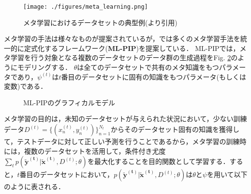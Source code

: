 \begin{figure}[tbp]
  \begin{center}
    \texttt{[image: ./figures/meta\_learning.png]}
    \caption{メタ学習におけるデータセットの典型例(\cite{Ravi2016}より引用)}
    \label{fig:ml_example}
  \end{center}
\end{figure}

メタ学習の手法は様々なものが提案されているが\cite{maml, Ravi2016}，\cite{Gordon2018}では多くのメタ学習手法を統一的に定式化するフレームワーク({\bf ML-PIP})を提案している．
ML-PIPでは，メタ学習を行う対象となる複数のデータセットのデータ群の生成過程をFig. \ref{fig:ml_pip}のようにモデリングする．
$\theta$は全てのデータセットで共有のメタ知識をもつパラメータであり，$\psi^{(t)}$は$t$番目のデータセットに固有の知識をもつパラメータ(もしくは変数)である．

\begin{figure}[tbp]
\begin{center}
\caption{ML-PIPのグラフィカルモデル}
\label{fig:ml_pip}
\end{center}
\end{figure}

メタ学習の目的は，未知のデータセットが与えられた状況において，少ない訓練データ$D ^ { ( t ) } = \{ ( x _ { n } ^ { ( t ) } , y _ { n } ^ { ( t ) } ) \} _ { n = 1 } ^ { N _ { t } }$からそのデータセット固有の知識を獲得して，テストデータに対して正しい予測を行うことであるから，メタ学習の訓練時には，複数のデータセットを活用して，条件付き尤度$\sum_{t} p(\bm{\tilde{y}^{(t)}} | \bm{\tilde{x}^{(t)}}, D^{(t)}; \theta)$を最大化することを目的関数として学習する．すると，$t$番目のデータセットにおいて，$p(\bm{\tilde{y}^{(t)}} | \bm{\tilde{x}^{(t)}}, D^{(t)}; \theta)$は$\theta$と$\psi$を用いて以下のように表される．

